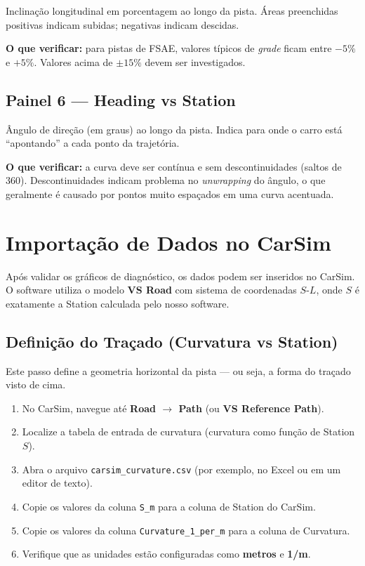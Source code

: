 \documentclass[a4paper,12pt]{article}
\begin{document}
Inclinação longitudinal em porcentagem ao longo da pista. Áreas preenchidas positivas indicam subidas; negativas indicam descidas.

\textbf{O que verificar:} para pistas de FSAE, valores típicos de \textit{grade} ficam entre $-5\%$ e $+5\%$. Valores acima de $\pm 15\%$ devem ser investigados.

\subsection{Painel 6 --- Heading vs Station}

Ângulo de direção (em graus) ao longo da pista. Indica para onde o carro está ``apontando'' a cada ponto da trajetória.

\textbf{O que verificar:} a curva deve ser contínua e sem descontinuidades (saltos de 360\degree). Descontinuidades indicam problema no \textit{unwrapping} do ângulo, o que geralmente é causado por pontos muito espaçados em uma curva acentuada.


\section{Importação de Dados no CarSim}

Após validar os gráficos de diagnóstico, os dados podem ser inseridos no CarSim. O software utiliza o modelo \textbf{VS Road} com sistema de coordenadas $S$-$L$, onde $S$ é exatamente a Station calculada pelo nosso software.

\subsection{Definição do Traçado (Curvatura vs Station)}

Este passo define a geometria horizontal da pista --- ou seja, a forma do traçado visto de cima.

\begin{enumerate}
    \item No CarSim, navegue até \textbf{Road $\rightarrow$ Path} (ou \textbf{VS Reference Path}).
    \item Localize a tabela de entrada de curvatura (curvatura como função de Station $S$).
    \item Abra o arquivo \texttt{carsim\_curvature.csv} (por exemplo, no Excel ou em um editor de texto).
    \item Copie os valores da coluna \texttt{S\_m} para a coluna de Station do CarSim.
    \item Copie os valores da coluna \texttt{Curvature\_1\_per\_m} para a coluna de Curvatura.
    \item Verifique que as unidades estão configuradas como \textbf{metros} e \textbf{1/m}.
\end{enumerate}
\end{document}
